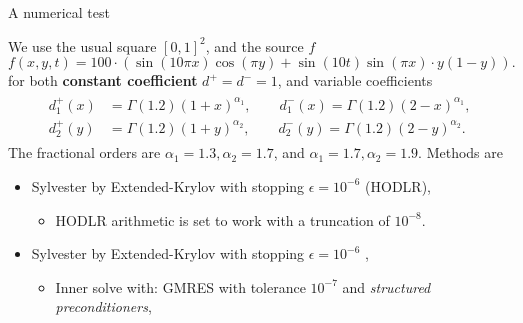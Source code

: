 \documentclass[aspectratio=169,xcolor=dvipsnames]{beamer}
\begin{document}
\begin{frame}{A numerical test~\parencite{MR3995304}}
	
We use the usual square $[0, 1]^2$, and the source $f$
\[
f(x,y,t) = 100 \cdot \left(\sin(10 \pi x) \cos(\pi y) +
\sin(10 t) \sin(\pi x) \cdot y (1 - y) \right).
\]
for both \textbf{constant coefficient} $d^+ = d^- = 1$, and variable coefficients
 \begin{align*}
 	\begin{split}
 		d_{1}^{+}(x) &= \Gamma(1.2) (1 + x)^{\alpha_1}, \qquad
 		d_{1}^{-}(x) = \Gamma(1.2) (2 - x)^{\alpha_1},  \\
 		d_{2}^{+}(y) &= \Gamma(1.2) (1 + y)^{\alpha_2}, \qquad
 		d_{2}^{-}(y) = \Gamma(1.2) (2 - y)^{\alpha_2}.
 	\end{split}
 \end{align*}
The fractional orders are $\alpha_1 = 1.3, \alpha_2 = 1.7$, and $\alpha_1 = 1.7, \alpha_2 = 1.9$.
Methods are
\begin{itemize}
	\item[\faHammer] Sylvester by Extended-Krylov with stopping $\epsilon = 10^{-6}$ (HODLR),
	\begin{itemize}
		\item[\faWrench] HODLR arithmetic is set to work with a truncation of $10^{-8}$.
	\end{itemize}
	\item[\faHammer] Sylvester by Extended-Krylov with stopping $\epsilon = 10^{-6}$ \parencite{MR3498143},
	\begin{itemize}
		\item[\faWrench] Inner solve with: GMRES with tolerance $10^{-7}$ and \emph{structured preconditioners},
	\end{itemize}
\end{itemize}
\end{frame}
\end{document}
